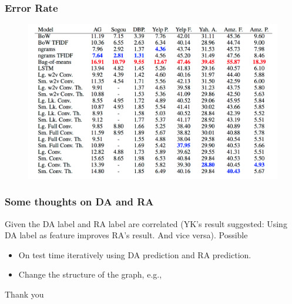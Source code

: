 \documentclass{beamer}
\begin{document}
\begin{frame}
\frametitle{Error Rate}
\begin{figure}
\includegraphics[scale=0.3]{error_rate}
\end{figure}
\end{frame}

\begin{frame}
\frametitle{Some thoughts on DA and RA}
Given the DA label and RA label are correlated (YK's result suggested: Using DA label as feature improves RA's result. And vice versa). Possible 
\begin{itemize}
\item On test time iteratively using DA prediction and RA prediction. 
\item Change the structure of the graph, e.g.,  
\end{itemize}

\end{frame}




\begin{frame}
\center
\huge Thank you

\end{frame}
\end{document}
